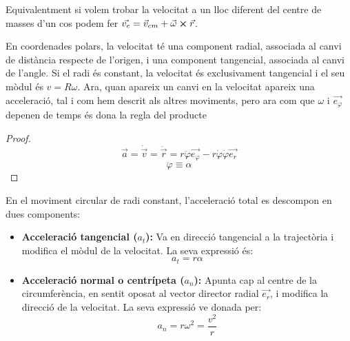 \documentclass[12pt]{article}
\begin{document}
Equivalentment si volem trobar la velocitat a un lloc diferent del centre de masses d'un cos podem fer $\vec{v_e} = \vec{v}_{cm} + \vec{\omega}\cross\vec{r}$.

En coordenades polars, la velocitat té una component radial, associada al canvi de distància respecte de l’origen, i una component tangencial, associada al canvi de l’angle. Si el radi és constant, la velocitat és exclusivament tangencial i el seu mòdul és $v=R\omega$. Ara, quan apareix un canvi en la velocitat apareix una acceleració, tal i com hem descrit als altres moviments, pero ara com que $\omega$ i $\vec{e_{\varphi}}$ depenen de temps és dona la regla del producte

\begin{center}
\end{center}

\begin{proof}
    \[\vec{a} = \dot{\vec{v}} = \ddot{\vec{r}} = r\ddot{\varphi}\vec{e_{\varphi}} - r\dot{\varphi}\dot{\varphi} \vec{e_r}\]
    \[\ddot{\varphi} \equiv \alpha\]
\end{proof}

En el moviment circular de radi constant, l’acceleració total es descompon en dues components:

\begin{itemize}
    \item \textbf{Acceleració tangencial ($a_t$):} Va en direcció tangencial a la trajectòria i modifica el mòdul de la velocitat. La seva expressió és:
    \[
    a_t = r\alpha
    \]
    
    \item \textbf{Acceleració normal o centrípeta ($a_n$):} Apunta cap al centre de la circumferència, en sentit oposat al vector director radial $\vec{e_r}$, i modifica la direcció de la velocitat. La seva expressió ve donada per:
    \[
    a_n = r\omega^2 = \frac{v^2}{r}
    \]
\end{itemize}
\end{document}
